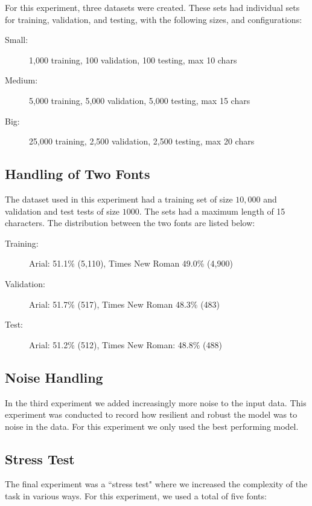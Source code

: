 For this experiment, three datasets were created. These sets had individual sets for training, validation, and testing, with the following sizes, and configurations:

\vspace{0.5cm}
\begin{minipage}{0.8\linewidth}
    \begin{description}
        \item[Small:]{1,000 training, 100 validation, 100 testing, max 10 chars}
        \item[Medium:]{5,000 training, 5,000 validation, 5,000 testing, max 15 chars}
        \item[Big:]{25,000 training, 2,500 validation, 2,500 testing, max 20 chars}
    \end{description}
\end{minipage}

\subsection{Handling of Two Fonts}
The dataset used in this experiment had a training set of size \(10,000\) and validation and test tests of size \(1000\). The sets had a maximum length of 15 characters. The distribution between the two fonts are listed below:

\vspace{0.5cm}
\begin{minipage}{0.8\linewidth}
    \begin{description}
        \item[Training:]{Arial: 51.1\% (5,110), Times New Roman 49.0\% (4,900)}
        \item[Validation:]{Arial: 51.7\% (517), Times New Roman 48.3\% (483)}
        \item[Test:]{Arial: 51.2\% (512), Times New Roman: 48.8\% (488)}
    \end{description}
\end{minipage}

\subsection{Noise Handling}
In the third experiment we added increasingly more noise to the input data. This experiment was conducted to record how resilient and robust the model was to noise in the data. For this experiment we only used the best performing model. 

\subsection{Stress Test}
The final experiment was a ``stress test" where we increased the complexity of the task in various ways. For this experiment, we used a total of five fonts:

